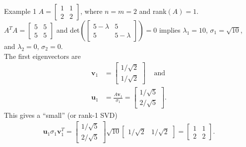 \documentclass[aspectratio=169,xcolor=dvipsnames]{beamer}
\begin{document}
\begin{frame}{Example 1}
$A = \begin{bmatrix}
    1 & 1\\ 2 & 2
\end{bmatrix}$, where $n=m=2$ and rank$(A)=1$.\\
$A^{T} A = \begin{bmatrix}
    5 & 5\\ 5 & 5
\end{bmatrix}$ and det$\left( \begin{bmatrix}
    5-\lambda & 5\\ 5 & 5-\lambda
\end{bmatrix}\right) = 0$ implies $\lambda_1=10$, $\sigma_1=\sqrt{10}$, and $\lambda_2=0$, $\sigma_2 =0$.\\
The first eigenvectors are
\begin{align*}
    \textbf{v}_1 &= \begin{bmatrix}
        1 / \sqrt{2}\\
        1/\sqrt{2}
    \end{bmatrix}\, \quad\text{and}\\
    \textbf{u}_1 &= \frac{A \textbf{v}_1}{\sigma_1} = \begin{bmatrix}
        1 / \sqrt{5} \\ 2 / \sqrt{5}
    \end{bmatrix} .
\end{align*}
This gives a \enquote{small} (or rank-1 SVD) 
\begin{align*}
    \textbf{u}_1 \sigma_1 \textbf{v}^{T}_1 = \begin{bmatrix}
        1 / \sqrt{5} \\ 2 / \sqrt{5} 
    \end{bmatrix} \sqrt{10} \begin{bmatrix}
        1 / \sqrt{2} & 1/ \sqrt{2}
    \end{bmatrix} = \begin{bmatrix}
        1 & 1\\ 2 & 2
    \end{bmatrix} .
\end{align*}
\end{frame}
\end{document}
